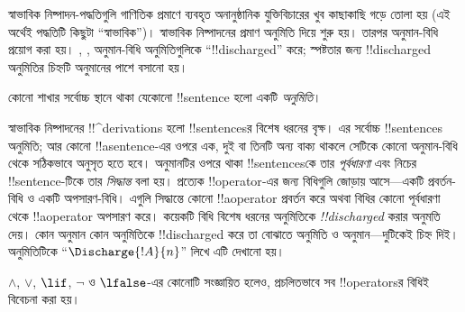 \documentclass[../../../include/open-logic-section]{subfiles}
\begin{document}
      {}
      {}


\begin{explain}
স্বাভাবিক নিষ্পাদন-পদ্ধতিগুলি গাণিতিক প্রমাণে ব্যবহৃত অনানুষ্ঠানিক
যুক্তিবিচারের খুব কাছাকাছি গড়ে তোলা হয় (এই অর্থেই পদ্ধতিটি কিছুটা
``স্বাভাবিক'')। স্বাভাবিক নিষ্পাদনের প্রমাণ অনুমিতি দিয়ে শুরু হয়।
তারপর অনুমান-বিধি প্রয়োগ করা হয়। \Intro{\lnot}, \Intro{\lif},
অনুমান-বিধি অনুমিতিগুলিকে ``!!{discharged}'' করে; স্পষ্টতার জন্য
!!{discharged} অনুমিতির চিহ্নটি অনুমানের পাশে বসানো হয়।
\end{explain}

\begin{defn}[অনুমিতি]
কোনো শাখার সর্বোচ্চ স্থানে থাকা যেকোনো !!{sentence} হলো একটি
\emph{অনুমিতি}।
\end{defn}

স্বাভাবিক নিষ্পাদনের !!^{derivation}s হলো !!{sentence}sর বিশেষ ধরনের
বৃক্ষ। এর সর্বোচ্চ !!{sentence}s অনুমিতি; আর কোনো !!a{sentence}-এর
ওপরে এক, দুই বা তিনটি অন্য বাক্য থাকলে সেটিকে কোনো অনুমান-বিধি থেকে
সঠিকভাবে অনুসৃত হতে হবে। অনুমানটির ওপরে থাকা !!{sentence}sকে তার
\emph{পূর্বধারণা} এবং নিচের !!{sentence}-টিকে তার \emph{সিদ্ধান্ত}
বলা হয়। প্রত্যেক !!{operator}-এর জন্য বিধিগুলি জোড়ায় আসে—একটি
প্রবর্তন-বিধি ও একটি অপসারণ-বিধি। এগুলি সিদ্ধান্তে কোনো
!!a{operator} প্রবর্তন করে অথবা বিধির কোনো পূর্বধারণা থেকে
!!a{operator} অপসারণ করে। কয়েকটি বিধি বিশেষ ধরনের অনুমিতিকে
\emph{!!{discharged}} করার অনুমতি দেয়। কোন অনুমান কোন অনুমিতিকে
!!{discharged} করে তা বোঝাতে অনুমিতি ও অনুমান—দুটিকেই চিহ্ন দিই।
অনুমিতিটিকে ``$\Discharge{!A}{n}$'' লিখে এটি দেখানো হয়।



%
	{$\land$, $\lor$, $\lif$, $\lnot$ ও $\lfalse$-এর কোনোটি সংজ্ঞায়িত হলেও, প্রচলিতভাবে সব !!{operator}sর বিধিই বিবেচনা করা হয়।}
\end{document}
